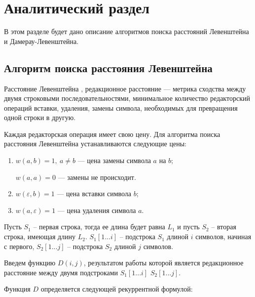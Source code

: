 \chapter{Аналитический раздел}


В этом разделе будет дано описание алгоритмов поиска расстояний Левенштейна и Дамерау-Левенштейна. 

\section{Алгоритм поиска расстояния Левенштейна}

Расстояние Левенштейна \cite{Lev}, редакционное расстояние — метрика сходства между двумя строковыми последовательностями, минимальное количество редакторский операций вставки, удаления, замены символа, необходимых для превращения одной строки в другую.

Каждая редакторская операция имеет свою цену. Для алгоритма поиска расстояния Левенштейна устанавливаются следующие цены:  

\begin{enumerate}[label=\arabic*)]
	\item $w(a, b) = 1, \medspace a \neq b$ --- цена замены символа $a$ на $b$;
	
	 $w(a,a)=0$ --- замены не происходит.
	 
	\item $w(\varepsilon, b) = 1$ --- цена вставки символа $b$;
	\item $w(a, \varepsilon) = 1$ --- цена удаления символа $a$.
\end{enumerate}

Пусть $S_1$ -- первая строка, тогда ее длина будет равна $L_1$ и пусть $S_2$ -- вторая строка, имеющая длину $L_2$. $S_1[1...i]$ -- подстрока $S_1$ длиной $i$ символов, начиная с первого, $S_2[1...j]$ -- подстрока $S_2$ длиной $j$ символов.

Введем функцию $D(i,j)$, результатом работы которой является редакционное расстояние между двумя подстроками $S_1[1...i]$ $S_2[1...j]$.

Функция $D$ определяется следующей рекуррентной формулой:

